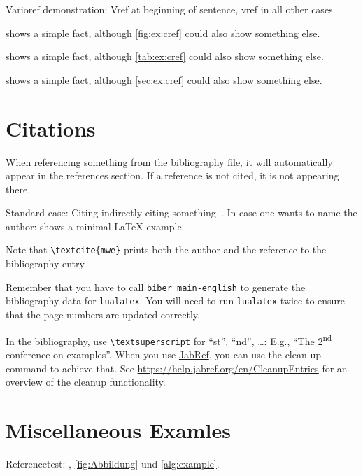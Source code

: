 Varioref demonstration: Vref at beginning of sentence, vref in all other cases.

\begin{ltgexample}
 shows a simple fact, although \vref{fig:ex:cref} could also show something else.

 shows a simple fact, although \vref{tab:ex:cref} could also show something else.

 shows a simple fact, although \vref{sec:ex:cref} could also show something else.
\end{ltgexample}

\section{Citations}

When referencing something from the bibliography file, it will automatically appear in the references section.
If a reference is not cited, it is not appearing there.

\begin{ltgexample}
Standard case: Citing indirectly citing something~\cite{mwe}.
In case one wants to name the author: \textcite{mwe} shows a minimal \LaTeX{} example.
\end{ltgexample}

Note that \texttt{\textbackslash textcite\{mwe\}} prints both the author and the reference to the bibliography entry.

Remember that you have to call \texttt{biber main-english} to generate the bibliography data for \texttt{lualatex}.
You will need to run \texttt{lualatex} twice to ensure that the page numbers are updated correctly.


In the bibliography, use \texttt{\textbackslash textsuperscript} for \enquote{st}, \enquote{nd}, \ldots:
E.g., \enquote{The 2\textsuperscript{nd} conference on examples}.
When you use \href{https://www.jabref.org}{JabRef}, you can use the clean up command to achieve that.
See \url{https://help.jabref.org/en/CleanupEntries} for an overview of the cleanup functionality.

\section{Miscellaneous Examles}
\label{ssec:example}

Referencetest: , \cref{fig:Abbildung} und \cref{alg:example}.

